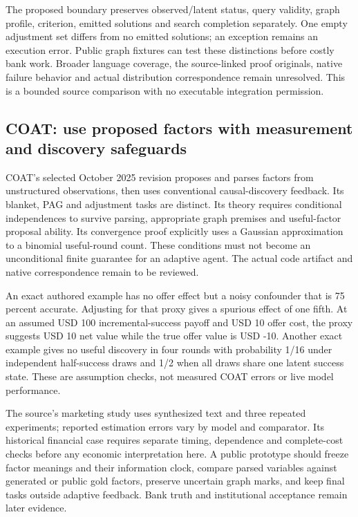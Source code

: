 The proposed boundary preserves observed/latent status, query validity,
graph profile, criterion, emitted solutions and search completion
separately. One empty adjustment set differs from no emitted solutions;
an exception remains an execution error. Public graph fixtures can test
these distinctions before costly bank work. Broader language coverage,
the source-linked proof originals, native failure behavior and actual
distribution correspondence remain unresolved. This is a bounded source
comparison with no executable integration permission.
\citep{exec19_otherid_julia,exec19_otherid_dagitty,exec19_otherid_reference}

\hypertarget{coat-use-proposed-factors-with-measurement-and-discovery-safeguards}{%
\subsection{COAT: use proposed factors with measurement and discovery
safeguards}\label{coat-use-proposed-factors-with-measurement-and-discovery-safeguards}}

COAT's selected October 2025 revision proposes and parses factors from
unstructured observations, then uses conventional causal-discovery
feedback. Its blanket, PAG and adjustment tasks are distinct. Its theory
requires conditional independences to survive parsing, appropriate graph
premises and useful-factor proposal ability. Its convergence proof
explicitly uses a Gaussian approximation to a binomial useful-round
count. These conditions must not become an unconditional finite
guarantee for an adaptive agent. The actual code artifact and native
correspondence remain to be reviewed. \citep{exec19_coat}

An exact authored example has no offer effect but a noisy confounder
that is 75 percent accurate. Adjusting for that proxy gives a spurious
effect of one fifth. At an assumed USD 100 incremental-success payoff
and USD 10 offer cost, the proxy suggests USD 10 net value while the
true offer value is USD -10. Another exact example gives no useful
discovery in four rounds with probability 1/16 under independent
half-success draws and 1/2 when all draws share one latent success
state. These are assumption checks, not measured COAT errors or live
model performance. \citep{exec19_coat_reference}

The source's marketing study uses synthesized text and three repeated
experiments; reported estimation errors vary by model and comparator.
Its historical financial case requires separate timing, dependence and
complete-cost checks before any economic interpretation here. A public
prototype should freeze factor meanings and their information clock,
compare parsed variables against generated or public gold factors,
preserve uncertain graph marks, and keep final tasks outside adaptive
feedback. Bank truth and institutional acceptance remain later evidence.
\citep{exec19_coat}

